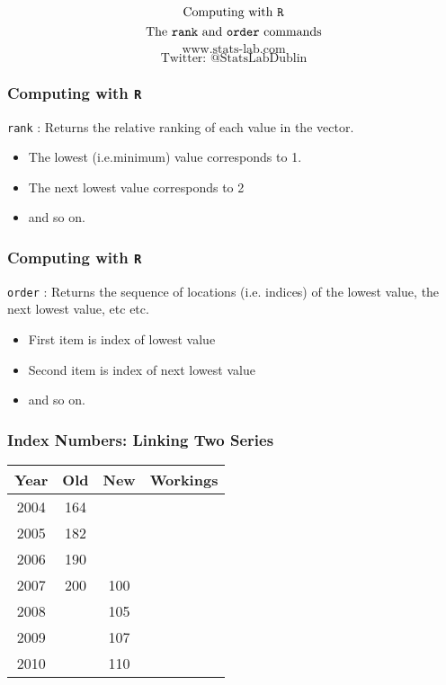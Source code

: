 \documentclass{beamer}
\begin{document}
\begin{frame}
\bigskip
{
\huge
\[ \mbox{Computing with \texttt{R}}  \]
\[ \mbox{The \texttt{rank} and \texttt{order} commands}  \]
}
{
\LARGE
\[ \mbox{www.stats-lab.com}  \]
\[ \mbox{Twitter: @StatsLabDublin} \]
}
\end{frame}
\begin{frame}
\frametitle{Computing with \texttt{R}}
\LARGE
 \texttt{rank} : Returns the relative ranking of each value in the vector.
\begin{itemize}
\item The lowest (i.e.minimum) value corresponds to 1.
\item The next lowest value corresponds to 2
\item and so on.
\end{itemize}
\end{frame}
\begin{frame}
\frametitle{Computing with \texttt{R}}
\LARGE
 \texttt{order} : Returns the sequence of locations (i.e. indices) of the lowest value, the next lowest value, etc etc.

\begin{itemize}
\item First item is index of lowest value
\item Second item is index of next lowest value
\item and so on.
\end{itemize}

\end{frame}
\begin{frame}
\frametitle{Index Numbers: Linking Two Series}

\begin{tabular}
{|c|c|c|c|}
Year	&	Old	&	New	&	Workings	\\ \hline
2004	&	164	&		&		\\ \hline
2005	&	182	&		&		\\ \hline
2006	&	190	&		&		\\ \hline
2007	&	200	&	100	&		\\ \hline
2008	&		&	105	&		\\ \hline
2009	&		&	107	&		\\ \hline
2010	&		&	110	&		\\ \hline
\end{tabular}  

\end{frame}
\end{document}
